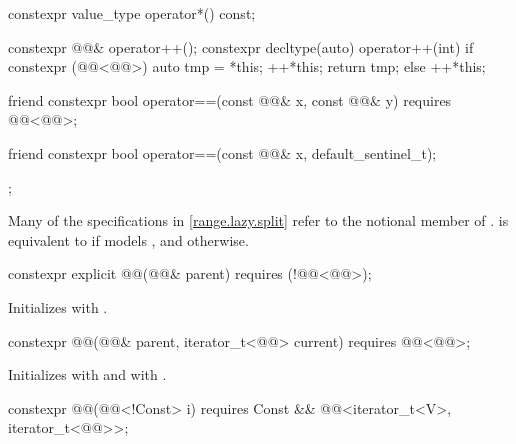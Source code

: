 \begin{codeblock}
{{    constexpr value_type operator*() const;

    constexpr @@& operator++();
    constexpr decltype(auto) operator++(int) {
      if constexpr (@@<@@>) {
        auto tmp = *this;
        ++*this;
        return tmp;
      } else
        ++*this;
    }

    friend constexpr bool operator==(const @@& x, const @@& y)
      requires @@<@@>;

    friend constexpr bool operator==(const @@& x, default_sentinel_t);
  };
}
\end{codeblock}

\pnum
Many of the specifications in \ref{range.lazy.split} refer to the notional member
 of .
 is equivalent to  if 
models , and  otherwise.

%
\begin{itemdecl}
constexpr explicit @@(@@& parent)
  requires (!@@<@@>);
\end{itemdecl}

\begin{itemdescr}
\pnum
\effects
Initializes  with .
\end{itemdescr}

%
\begin{itemdecl}
constexpr @@(@@& parent, iterator_t<@@> current)
  requires @@<@@>;
\end{itemdecl}

\begin{itemdescr}
\pnum
\effects
Initializes  with 
and  with .
\end{itemdescr}

%
\begin{itemdecl}
constexpr @@(@@<!Const> i)
  requires Const && @@<iterator_t<V>, iterator_t<@@>>;
\end{itemdecl}

